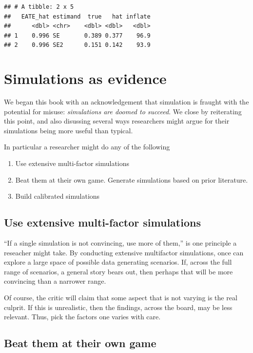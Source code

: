 \documentclass[
]{book}
\providecommand{\tightlist}{%
  \setlength{\itemsep}{0pt}\setlength{\parskip}{0pt}}
\begin{document}
\begin{verbatim}
## # A tibble: 2 x 5
##   EATE_hat estimand  true   hat inflate
##      <dbl> <chr>    <dbl> <dbl>   <dbl>
## 1    0.996 SE       0.389 0.377    96.9
## 2    0.996 SE2      0.151 0.142    93.9
\end{verbatim}

\hypertarget{simulations-as-evidence}{%
\chapter{Simulations as evidence}\label{simulations-as-evidence}}

We began this book with an acknowledgement that simulation is fraught with the potential for misuse: \emph{simulations are doomed to succeed}.
We close by reiterating this point, and also disussing several ways researchers might argue for their simulations being more useful than typical.

In particular a researcher might do any of the following

\begin{enumerate}
\def\labelenumi{\arabic{enumi}.}
\tightlist
\item
  Use extensive multi-factor simulations
\item
  Beat them at their own game. Generate simulations based on prior literature.
\item
  Build calibrated simulations
\end{enumerate}

\hypertarget{use-extensive-multi-factor-simulations}{%
\section{Use extensive multi-factor simulations}\label{use-extensive-multi-factor-simulations}}

``If a single simulation is not convincing, use more of them,'' is one principle a reseacher might take.
By conducting extensive multifactor simulations, once can explore a large space of possible data generating scenarios.
If, across the full range of scenarios, a general story bears out, then perhaps that will be more convincing than a narrower range.

Of course, the critic will claim that some aspect that is not varying is the real culprit.
If this is unrealistic, then the findings, across the board, may be less relevant.
Thus, pick the factors one varies with care.

\hypertarget{beat-them-at-their-own-game}{%
\section{Beat them at their own game}\label{beat-them-at-their-own-game}}
\end{document}
